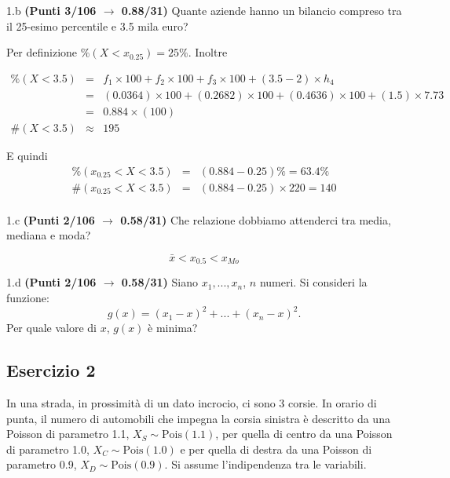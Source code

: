\documentclass[
  11pt,
]{book}
\theoremstyle{mytheoremstyle}
\theoremstyle{mydefstyle}
\newenvironment{sol}
  {
  \begin{tcolorbox}[enhanced,breakable,arc=0.1mm,boxrule=1pt,colback=white,colframe=iblue,
  title=\bf \fontfamily{lmss}\selectfont \hspace{.5 cm} Soluzione,drop fuzzy shadow]

}{
\end{tcolorbox}
  }
\begin{document}
1.b \textbf{(Punti 3/106 \(\rightarrow\) 0.88/31)} Quante aziende hanno un bilancio compreso tra il 25-esimo
percentile e 3.5 mila euro?

\begin{sol}
Per definizione \(\%(X<x_{ 0.25 })= 25 \%\). Inoltre

\begin{eqnarray*}
   \%(X< 3.5 ) &=&  f_{ 1 }\times 100+f_{ 2 }\times 100+f_{ 3 }\times 100 +( 3.5 - 2 )\times h_{ 4 } \\
                &=&  ( 0.0364 )\times 100+( 0.2682 )\times 100+( 0.4636 )\times 100 +( 1.5 )\times  7.73  \\
                &=&  0.884 \times(100) \\
\#(X< 3.5 )    &\approx& 195 
\end{eqnarray*}

E quindi
\begin{eqnarray*}
   \%( x_{0.25} < X < 3.5 ) &=& ( 0.884 - 0.25 )\%= 63.4 \% \\
   \#( x_{0.25} < X < 3.5 ) &=& ( 0.884 - 0.25 )\times  220 = 140  \\
\end{eqnarray*}

\end{sol}

1.c \textbf{(Punti 2/106 \(\rightarrow\) 0.58/31)} Che relazione dobbiamo attenderci tra media, mediana e moda?

\begin{sol}
\[\bar x<x_{0.5}<x_{Mo}\]

\end{sol}

1.d \textbf{(Punti 2/106 \(\rightarrow\) 0.58/31)} Siano \(x_1,...,x_n\), \(n\) numeri. Si consideri la funzione:
\[g(x)=(x_1-x)^2+...+(x_n-x)^2.\]
Per quale valore di \(x\), \(g(x)\) è minima?

\subsection{Esercizio 2}\label{esercizio-2-17}

In una strada, in prossimità di un dato incrocio, ci sono 3 corsie.
In orario di punta, il numero di automobili che impegna la corsia sinistra è descritto
da una Poisson di parametro 1.1, \(X_S\sim\text{Pois}(1.1)\), per quella di centro da una Poisson di parametro 1.0, \(X_C\sim\text{Pois}(1.0)\) e per quella di destra da una Poisson di parametro 0.9, \(X_D\sim\text{Pois}(0.9)\). Si assume l'indipendenza tra le variabili.
\end{document}
